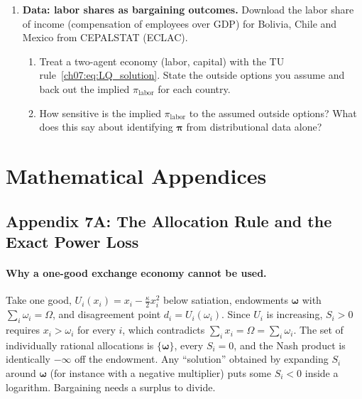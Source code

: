 \documentclass[../structural_economics_book.tex]{subfiles}
\begin{document}
\begin{enumerate}[label=\textbf{7.\arabic*}, leftmargin=3em]
\item \textbf{Data: labor shares as bargaining outcomes.} Download the labor share of income (compensation of employees over GDP) for Bolivia, Chile and Mexico from CEPALSTAT (ECLAC).
\begin{enumerate}
\item Treat a two-agent economy (labor, capital) with the TU rule~\eqref{ch07:eq:LQ_solution}. State the outside options you assume and back out the implied $\pi_{\text{labor}}$ for each country.
\item How sensitive is the implied $\pi_{\text{labor}}$ to the assumed outside options? What does this say about identifying $\boldsymbol{\pi}$ from distributional data alone?
\end{enumerate}

\end{enumerate}


\newpage
\section*{Mathematical Appendices}

\subsection*{Appendix 7A: The Allocation Rule and the Exact Power Loss}
\label{ch07:app:LQ_derivation}

\paragraph{Why a one-good exchange economy cannot be used.} Take one good, $U_i(x_i) = x_i - \frac{\kappa}{2}x_i^2$ below satiation, endowments $\boldsymbol{\omega}$ with $\sum_i \omega_i = \Omega$, and disagreement point $d_i = U_i(\omega_i)$. Since $U_i$ is increasing, $S_i > 0$ requires $x_i > \omega_i$ for every $i$, which contradicts $\sum_i x_i = \Omega = \sum_i \omega_i$. The set of individually rational allocations is $\{\boldsymbol{\omega}\}$, every $S_i = 0$, and the Nash product is identically $-\infty$ off the endowment. Any ``solution'' obtained by expanding $S_i$ around $\boldsymbol{\omega}$ (for instance with a negative multiplier) puts some $S_i < 0$ inside a logarithm. Bargaining needs a surplus to divide.
\end{document}
